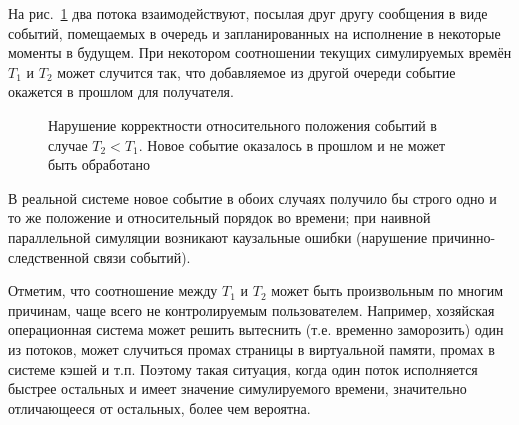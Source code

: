 
На рис.~\ref{fig:two-queues-2} два потока взаимодействуют, посылая друг другу сообщения в виде событий, помещаемых в очередь и запланированных на исполнение в некоторые моменты в будущем. При некотором соотношении текущих симулируемых времён $T_1$ и $T_2$ может случится так, что добавляемое из другой очереди событие окажется в прошлом для получателя.

\begin{figure}[htbp]
    \centering
    \caption[Нарушение корректности относительного положения событий]{Нарушение корректности относительного положения событий в случае $T_2 < T_1$. Новое событие оказалось в прошлом и не может быть обработано}
    \label{fig:two-queues-2}
\end{figure}

В реальной системе новое событие в обоих случаях получило бы строго одно и то же положение и относительный порядок во времени; при наивной параллельной симуляции возникают каузальные ошибки (нарушение причинно-следственной связи событий).

Отметим, что соотношение между $T_1$ и $T_2$ может быть произвольным по многим причинам, чаще всего не контролируемым пользователем. Например, хозяйская операционная система может решить вытеснить (т.е. временно заморозить) один из потоков, может случиться промах страницы в виртуальной памяти, промах в системе кэшей и т.п. Поэтому такая ситуация, когда один поток исполняется быстрее остальных и имеет значение симулируемого времени, значительно отличающееся от остальных, более чем вероятна.



